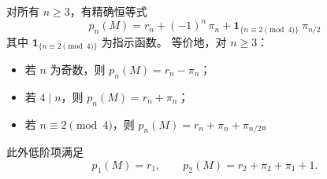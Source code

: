 \begin{theorem}\label{thm:real-input-40-prime-artin-splitting}
对所有 \(n\ge 3\)，有精确恒等式
\[
\boxed{\;
p_n(M)=r_n+(-1)^n\,\pi_n+\mathbf{1}_{\{n\equiv 2\!\!\pmod 4\}}\ \pi_{n/2}\;}
\]
其中 \(\mathbf{1}_{\{n\equiv 2\!\!\pmod 4\}}\) 为指示函数。
等价地，对 \(n\ge 3\)：
\begin{itemize}
  \item 若 \(n\) 为奇数，则 \(p_n(M)=r_n-\pi_n\)；
  \item 若 \(4\mid n\)，则 \(p_n(M)=r_n+\pi_n\)；
  \item 若 \(n\equiv 2\pmod 4\)，则 \(p_n(M)=r_n+\pi_n+\pi_{n/2}\)。
\end{itemize}
此外低阶项满足
\[
p_1(M)=r_1,
\qquad
p_2(M)=r_2+\pi_2+\pi_1+1.
\]
\end{theorem}
